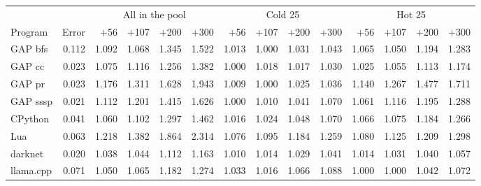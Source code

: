 \begin{tabular}{lrrrrrrrrrrrrr}
\toprule
 & & \multicolumn{4}{c}{All in the pool} & \multicolumn{4}{c}{Cold 25} & \multicolumn{4}{c}{Hot 25} \\
\cmidrule(lr){3-6}\cmidrule(lr){7-10}\cmidrule(lr){11-14}
Program & Error & +56 & +107 & +200 & +300 & +56 & +107 & +200 & +300 & +56 & +107 & +200 & +300 \\
\midrule
GAP bfs & 0.112 & 1.092 & 1.068 & 1.345 & 1.522 & 1.013 & 1.000 & 1.031 & 1.043 & 1.065 & 1.050 & 1.194 & 1.283 \\
GAP cc & 0.023 & 1.075 & 1.116 & 1.256 & 1.382 & 1.000 & 1.018 & 1.017 & 1.030 & 1.025 & 1.055 & 1.113 & 1.174 \\
GAP pr & 0.023 & 1.176 & 1.311 & 1.628 & 1.943 & 1.009 & 1.000 & 1.025 & 1.036 & 1.140 & 1.267 & 1.477 & 1.711 \\
GAP sssp & 0.021 & 1.112 & 1.201 & 1.415 & 1.626 & 1.000 & 1.010 & 1.041 & 1.070 & 1.061 & 1.116 & 1.195 & 1.288 \\
CPython & 0.041 & 1.060 & 1.102 & 1.297 & 1.462 & 1.016 & 1.024 & 1.048 & 1.070 & 1.066 & 1.075 & 1.184 & 1.266 \\
Lua & 0.063 & 1.218 & 1.382 & 1.864 & 2.314 & 1.076 & 1.095 & 1.184 & 1.259 & 1.080 & 1.125 & 1.209 & 1.298 \\
darknet & 0.020 & 1.038 & 1.044 & 1.112 & 1.163 & 1.010 & 1.014 & 1.029 & 1.041 & 1.014 & 1.031 & 1.040 & 1.057 \\
llama.cpp & 0.071 & 1.050 & 1.065 & 1.182 & 1.274 & 1.033 & 1.016 & 1.066 & 1.088 & 1.000 & 1.000 & 1.042 & 1.072 \\
\bottomrule
\end{tabular}
